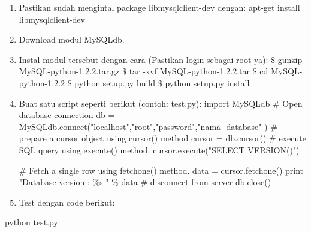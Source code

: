 \begin{enumerate}
\item Pastikan sudah mengintal package libmysqlclient-dev dengan: 
apt-get install libmysqlclient-dev 
\noindent 
\item Download modul MySQLdb. 
\noindent 
\item Instal modul tersebut dengan cara (Pastikan login sebagai root ya): 
 $  \$  $ gunzip MySQL-python-1.2.2.tar.gz 
 $  \$  $ tar -xvf MySQL-python-1.2.2.tar 
 $  \$  $ cd MySQL-python-1.2.2 
 $  \$  $ python setup.py build 
 $  \$  $ python setup.py install 
\noindent 
\item Buat satu script seperti berikut (contoh: test.py): 
import MySQLdb 
 $  \#  $ Open database connection 
db = MySQLdb.connect("localhost","root","password","nama $  \_  $database" ) 
 $  \#  $ prepare a cursor object using cursor() method 
cursor = db.cursor()
 $  \#  $ execute SQL query using execute() method. 
cursor.execute("SELECT VERSION()") \par
 $  \#  $ Fetch a single row using fetchone() method. 
data = cursor.fetchone() 
print "Database version :  $  \%  $s "  $  \%  $ data
 $  \#  $ disconnect from server
db.close()
\noindent 
\item Test dengan code berikut:\end{enumerate}
 \par
python test.py 
\vspace{12pt}
